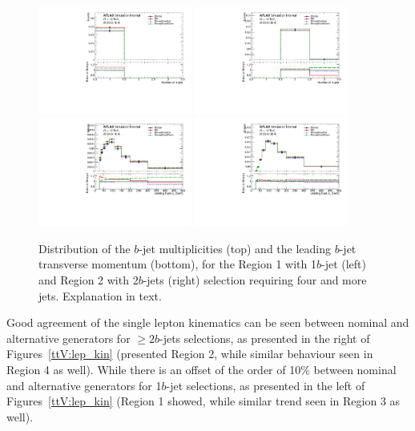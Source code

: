 \begin{figure}[!htb]
\centering
\includegraphics[width=0.45\textwidth]{Plots/ttV/c_Region_0_nBtagJets}
\includegraphics[width=0.45\textwidth]{Plots/ttV/c_Region_1_nBtagJets}\\
\includegraphics[width=0.45\textwidth]{Plots/ttV/c_Region_0_Bjet_Pt_0}
\includegraphics[width=0.45\textwidth]{Plots/ttV/c_Region_1_Bjet_Pt_0}\\
  \caption{Distribution of the $b$-jet multiplicities (top) and the leading $b$-jet transverse momentum (bottom), for the Region 1 with 1$b$-jet (left) and Region 2 with 2$b$-jets (right) selection requiring four and more jets. Explanation in text. \label{ttV:4jbinfo}}
\end{figure}

Good agreement of the single lepton kinematics can be seen between nominal and alternative generators for $\geq2b$-jets selections, as presented in the right of Figures~\ref{ttV:lep_kin} (presented Region 2, while similar behaviour seen in Region 4 as well). 
While there is an offset of the order of 10\%  between nominal and alternative generators for 1$b$-jet selections, as presented in the left of Figures~\ref{ttV:lep_kin} (Region 1 showed, while similar trend seen in Region 3 as well). 

